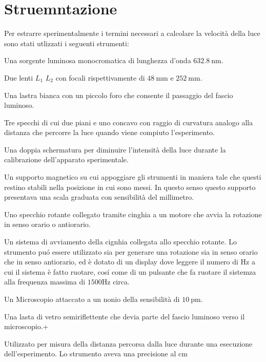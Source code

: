 \documentclass[a4paper,11pt]{article}
\begin{document}
\section{Struemntazione}

Per estrarre sperimentalmente i termini necessari a calcolare la velocità della luce sono stati utlizzati i seguenti strumenti:

\begin{description}[align=left]
	
	\item[Laser] Una sorgente luminosa monocromatica di lunghezza d'onda $\SI{632.8}{\nano\meter}$.
	\item[Lenti] Due lenti $L_1$ $L_2$ con focali rispettivamente di $\SI{48}{\milli\meter}$ e $\SI{252}{\milli\meter}$.
	\item[Squadra Forata] Una lastra bianca con un piccolo foro che consente il passaggio del fascio luminoso.
	\item[Specchi] Tre specchi di cui due piani e uno concavo con raggio di curvatura analogo alla distanza che percorre la luce quando viene compiuto l'esperimento.
	\item[Doppia Lamina Polaroid] Una doppia schermatura per diminuire l'intensità della luce durante la calibrazione dell'apparato sperimentale.
	\item[Supporto] Un supporto magnetico su cui appoggiare gli strumenti in maniera tale che questi restino stabili nella posizione in cui sono messi. In questo senso questo supporto presentava una scala graduata con sensibilità del millimetro.
	\item[Specchio Rotante] Uno specchio rotante collegato tramite cinghia a un motore che avvia la rotazione in senso orario o antiorario.
	\item[Motore] Un sistema di avviamento della cignhia collegata allo specchio rotante. Lo strumento pu\'o essere utilizzato sia per generare una rotazione sia in senso orario che in senso antiorario, ed è dotato di un display dove leggere il numero di Hz a cui il sistema è fatto ruotare, cos\'i come di un pulsante che fa ruotare il sistemza alla frequenza massima di $1500$Hz circa.
	\item[Microscopio] Un Microscopio attaccato a un nonio della sensibilità di $\SI{10}{\pico\meter}$.
	\item[Splitter] Una lasta di vetro semiriflettente che devia parte del fascio luminoso verso il microscopio.+
	\item[Metro] Utilizzato per misura della distanza percorsa dalla luce durante una esecuzione dell'esperimento. Lo strumento aveva una precisione al cm
\end{description}
	
\end{document}
